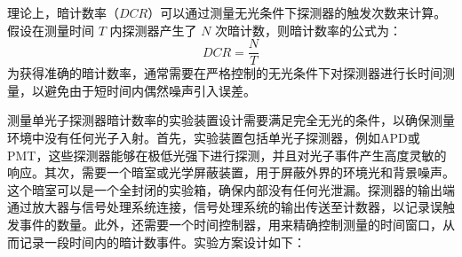 理论上，暗计数率（\( DCR \)）可以通过测量无光条件下探测器的触发次数来计算。假设在测量时间 \( T \) 内探测器产生了 \( N \) 次暗计数，则暗计数率的公式为：
\[
DCR = \frac{N}{T}
\]
为获得准确的暗计数率，通常需要在严格控制的无光条件下对探测器进行长时间测量，以避免由于短时间内偶然噪声引入误差。

测量单光子探测器暗计数率的实验装置设计需要满足完全无光的条件，以确保测量环境中没有任何光子入射。首先，实验装置包括单光子探测器，例如APD或PMT，这些探测器能够在极低光强下进行探测，并且对光子事件产生高度灵敏的响应。其次，需要一个暗室或光学屏蔽装置，用于屏蔽外界的环境光和背景噪声。这个暗室可以是一个全封闭的实验箱，确保内部没有任何光泄漏。探测器的输出端通过放大器与信号处理系统连接，信号处理系统的输出传送至计数器，以记录误触发事件的数量。此外，还需要一个时间控制器，用来精确控制测量的时间窗口，从而记录一段时间内的暗计数事件。实验方案设计如下：

